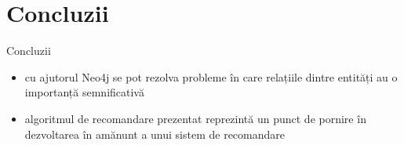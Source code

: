 \documentclass{beamer}
\begin{document}
\section{Concluzii}
\frame{\tableofcontents[currentsection]}
\begin{frame}{Concluzii}
	\begin{itemize}
	    \item cu ajutorul Neo4j se pot rezolva probleme în care relațiile dintre entități au o importanță semnificativă
	    \item algoritmul de recomandare prezentat reprezintă un punct de pornire în dezvoltarea în amănunt a unui sistem de recomandare
	\end{itemize}
\end{frame}
\end{document}
